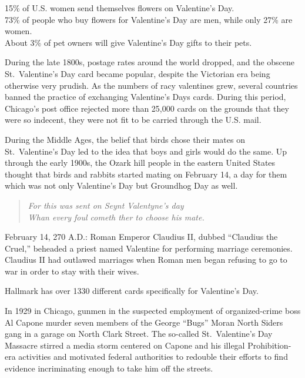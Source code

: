 \documentclass[12pt]{article}
\begin{document}
\setlength{\parindent}{0 cm}
\setlength{\parskip}{0.5 cm}

15\% of U.S. women send themselves flowers on Valentine's Day. \\
73\% of people who buy flowers for Valentine's Day are men, while only 27\% are women. \\
About 3\% of pet owners will give Valentine's Day gifts to their pets.

During the late 1800s, postage rates around the world dropped, and the obscene St.\ Valentine's Day card became popular, despite the Victorian era being otherwise very prudish. As the numbers of racy valentines grew, several countries banned the practice of exchanging Valentine's Days cards. During this period, Chicago's post office rejected more than 25,000 cards on the grounds that they were so indecent, they were not fit to be carried through the U.S. mail.

During the Middle Ages, the belief that birds chose their mates on St.\ Valentine's Day led to the idea that boys and girls would do the same. Up through the early 1900s, the Ozark hill people in the eastern United States thought that birds and rabbits started mating on February 14, a day for them which was not only Valentine's Day but Groundhog Day as well.
\vspace{-0.8 cm}
\hspace{1 cm}
\begin{center}
\begin{minipage}{0.7\linewidth}
\begin{quote}
\it For this was sent on Seynt Valentyne's day \\
Whan every foul cometh ther to choose his mate.
\end{quote}
\end{minipage}
\end{center}

February 14, 270 A.D.: Roman Emperor Claudius II, dubbed ``Claudius the Cruel,'' beheaded a priest named Valentine for performing marriage ceremonies. Claudius II had outlawed marriages when Roman men began refusing to go to war in order to stay with their wives.

Hallmark has over 1330 different cards specifically for Valentine's Day.

In 1929 in Chicago, gunmen in the suspected employment of organized-crime boss Al Capone murder seven members of the George ``Bugs'' Moran North Siders gang in a garage on North Clark Street. The so-called St.\ Valentine's Day Massacre stirred a media storm centered on Capone and his illegal Prohibition-era activities and motivated federal authorities to redouble their efforts to find evidence incriminating enough to take him off the streets.
\end{document}
